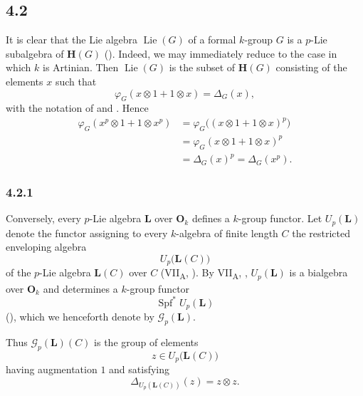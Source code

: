 
\subsection*{4.2}
\label{sga3:VIIB:4.2}

It is clear that the Lie algebra \(\operatorname{Lie}(G)\) of a
formal \(k\)-group \(G\) is a \(p\)-Lie subalgebra of
\(\mathbf H(G)\) \textup{()}. Indeed, we may immediately
reduce to the case in which \(k\) is Artinian. Then
\(\operatorname{Lie}(G)\) is the subset of \(\mathbf H(G)\)
consisting of the elements \(x\) such that
\[
  \varphi_G(x\otimes1+1\otimes x)=\Delta_G(x),
\]
with the notation of  and . Hence
\[
\begin{aligned}
  \varphi_G(x^p\otimes1+1\otimes x^p)
  &=
  \varphi_G\bigl((x\otimes1+1\otimes x)^p\bigr)
  \\
  &=
  \varphi_G(x\otimes1+1\otimes x)^p
  \\
  &=
  \Delta_G(x)^p
  =
  \Delta_G(x^p).
\end{aligned}
\]

\subsubsection*{4.2.1}
\label{sga3:VIIB:4.2.1}

Conversely, every \(p\)-Lie algebra \(\mathbf L\) over
\(\mathbf O_k\) defines a \(k\)-group functor. Let
\(U_p(\mathbf L)\) denote the functor assigning to every
\(k\)-algebra of finite length \(C\) the restricted enveloping
algebra
\[
  U_p\bigl(\mathbf L(C)\bigr)
\]
of the \(p\)-Lie algebra \(\mathbf L(C)\) over \(C\)
\textup{(VII\textsubscript{A}, )}. By
VII\textsubscript{A}, , \(U_p(\mathbf L)\) is a bialgebra over
\(\mathbf O_k\) and determines a \(k\)-group functor
\[
  \operatorname{Spf}^{*}U_p(\mathbf L)
\]
\textup{()}, which we henceforth denote by \(\mathscr G_p(\mathbf L)\).

Thus \(\mathscr G_p(\mathbf L)(C)\) is the group of elements
\[
  z\in U_p\bigl(\mathbf L(C)\bigr)
\]
having augmentation \(1\) and satisfying
\[
  \Delta_{U_p(\mathbf L(C))}(z)=z\otimes z.
\]

